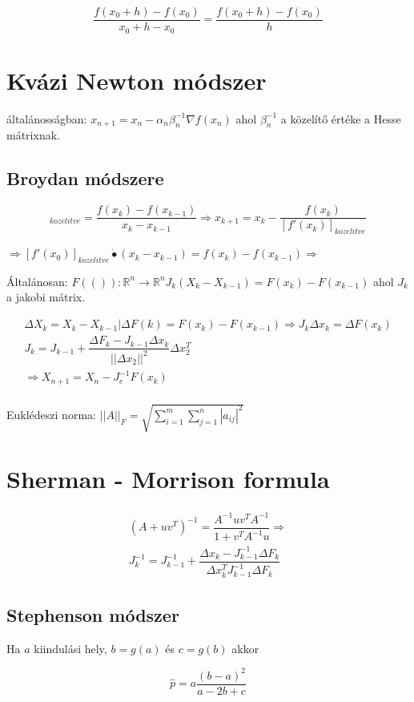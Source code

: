 \documentclass{article}
\begin{document}
\begin{equation}
\dfrac{f( x_0 +h) - f( x_0 )}{ x_0 + h - x_0 } = \dfrac{f( x_0 +h) - f( x_0 )}{h}
\end{equation}

\section{Kvázi Newton módszer}

általánosságban: $ x_{n+1} = x_n-\alpha_n \beta^{-1}_n \nabla f(x_n) $ ahol $\beta^{-1}_n $ a közelítő értéke a Hesse mátrixnak.

\subsection{Broydan módszere}

\begin{equation}
[f'( x_0 ) ]_{kozelitve} = \dfrac{f( x_k )- f( x_{k-1} )}{x_k - x_{k-1} } \Rightarrow x_{k+1} = x_k - \dfrac{f( x_k ) }{ [f'( x_k )]_{kozelitve} }
\end{equation}

$ \Rightarrow [f'( x_0 ) ]_{kozelitve} \dot{•} ( x_k - x_{k-1} ) = f( x_k ) - f( x_{k-1} ) \Rightarrow $

Általánosan: $ F(()): \mathbb{R} ^n \longrightarrow \mathbb{R}^n  J_k ( X_k - X_{k-1} ) = F( x_k )- F( x_{k-1} ) $ ahol $ J_k $ a jakobi mátrix.

\begin{multline}
\Delta X_k = X_k - X_{k-1} | \Delta F(k) = F( x_k) - F( x_{k-1} ) \Rightarrow J_k \Delta x_k = \Delta F( x_k ) \\
J_k = J_{k-1} + \dfrac{ \Delta F_k - J_{ k-1 } \Delta x_k }{ || \Delta x_2 ||^2 } \Delta x_2^T \\
\Rightarrow X_{n+1} = X_n - J_e^{-1} F( x_k )\\
\end{multline}

Euklédeszi norma: $ ||A||_F = \sqrt{  \sum_{i=1}^{m} \sum_{j=1}^{n} | a_{ij} |^2 } $

\section{Sherman - Morrison formula}

\begin{multline}
( A+uv^T )^{-1} = \dfrac{ A^{-1} uv^T A^{-1} }{ 1 + v^T A^{-1} u } \Rightarrow  \\
J_k^{-1} = J_{k-1}^{-1} + \dfrac{ \Delta x_k - J_{k-1}^{-1} \Delta F_k }{ \Delta x_k^T J_{k-1}^{-1} \Delta F_k }
\end{multline}

\subsection{Stephenson módszer}

Ha $ a $ kiindulási hely, $ b=g(a) $ és $ c = g(b) $ akkor 

\begin{equation}
\hat{p} = a \dfrac{ (b-a)^2 }{ a-2b+c }
\end{equation}
\end{document}
